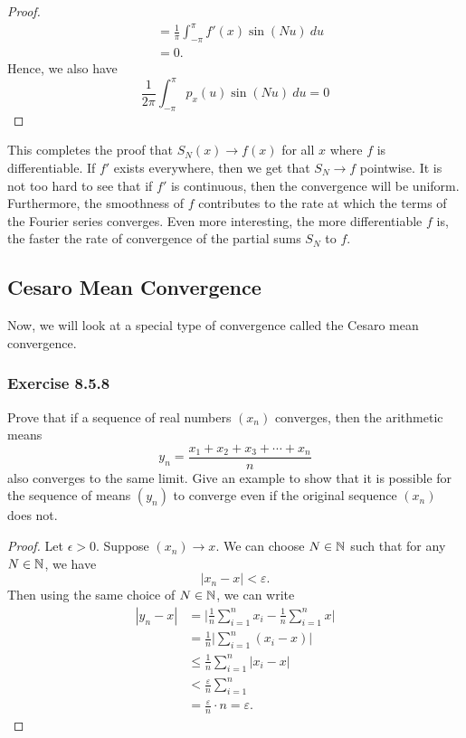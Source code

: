 \begin{enumerate}
\begin{proof}
\begin{align*}
                                                                                                                   &= \frac{ 1  }{ \pi  } \int_{ -\pi  }^{ \pi  } f'(x) \sin(Nu) \ du \\
                                                                                                                   &= 0.
        \end{align*}
        Hence, we also have 
        \[  \frac{ 1 }{ 2 \pi  } \int_{ -\pi  }^{ \pi  } p_{x}(u) \sin(Nu) \ du = 0 \]
        \end{proof}
\end{enumerate} 

This completes the proof that \( S_{N}(x) \to f(x)  \) for all \( x  \) where \( f  \) is differentiable.  If \( f'  \) exists everywhere, then we get that \( S_{N} \to f  \) pointwise. It is not too hard to see that if \( f'  \) is continuous, then the convergence will be uniform. Furthermore, the smoothness of \( f  \) contributes to the rate at which the terms of the Fourier series converges. Even more interesting, the more differentiable \( f  \) is, the faster the rate of convergence of the partial sums \( S_{N}  \) to \( f  \).

\subsection{Cesaro Mean Convergence}

Now, we will look at a special type of convergence called the Cesaro mean convergence.

\subsubsection{Exercise 8.5.8} Prove that if a sequence of real numbers \( (x_{n})  \) converges, then the arithmetic means 
\[  y_{n} = \frac{ x_{1} + x_{2} + x_{3 } + \dotsb + x_{n}  }{ n } \]
also converges to the same limit. Give an example to show that it is possible for the sequence of means \( (y_{n}) \) to converge even if the original sequence \( (x_{n}) \) does not.
\begin{proof}
    Let \( \epsilon > 0  \). Suppose \( (x_{n}) \to x  \). We can choose \( N \in \mathbb{N}  \) such that for any \( N \in \mathbb{N}  \), we have 
    \[  | x_{n} - x  | < \varepsilon.  \]
Then using the same choice of \( N \in \mathbb{N}  \), we can write 
\begin{align*}
    | y_{n} - x  | &= \Big| \frac{ 1 }{ n } \sum_{ i=1  }^{ n } x_{i} - \frac{ 1 }{ n }  \sum_{ i=1  }^{ n } x  \Big|  \\
                   &= \frac{ 1 }{ n }  \Big| \sum_{ i=1  }^{ n  } (x_{i } - x ) \Big| \\
                   &\leq \frac{ 1 }{ n }  \sum_{ i=1  }^{ n } | x_{i} -x  | \\
                   &< \frac{ \varepsilon }{ n } \sum_{ i=1 }^{ n } \\ 
                   &= \frac{ \varepsilon }{ n } \cdot n = \varepsilon.
\end{align*}
\end{proof}

